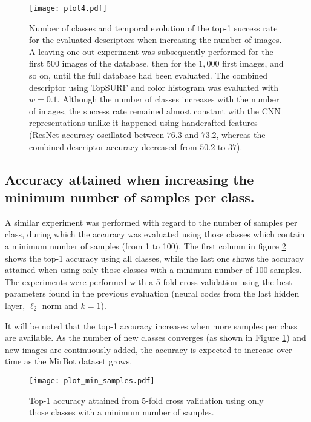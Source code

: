 \documentclass[final, twocolumn]{elsarticle}
\begin{document}
\begin{figure}
\center
\texttt{[image: plot4.pdf]}
\caption{\label{Plot4}Number of classes and temporal evolution of the top-1 success rate for the evaluated descriptors when increasing the number of images. A leaving-one-out experiment was subsequently performed for the first $500$ images of the database, then for the $1,000$ first images, and so on, until the full database had been evaluated. The combined descriptor using TopSURF and color histogram was evaluated with $w=0.1$. Although the number of classes increases with the number of images, the success rate remained almost constant with the CNN representations unlike it happened using handcrafted features (ResNet accuracy oscillated between $76.3$ and $73.2$, whereas the combined descriptor accuracy decreased from $50.2$ to $37$).}
\end{figure}


\subsection{Accuracy attained when increasing the minimum number of samples per class.}

A similar experiment was performed with regard to the number of samples per class, during which the accuracy was evaluated using those classes which contain a minimum number of samples (from 1 to 100). The first column in figure \ref{fig:plot_min_samples} shows the top-1 accuracy using all classes, while the last one shows the accuracy attained when using only those classes with a minimum number of 100 samples. The experiments were performed with a 5-fold cross validation using the best parameters found in the previous evaluation (neural codes from the last hidden layer, $\ell_2$ norm and $k=1$). 

It will be noted that the top-1 accuracy increases when more samples per class are available. As the number of new classes converges (as shown in Figure \ref{Plot4}) and new images are continuously added, the accuracy is expected to increase over time as the MirBot dataset grows. 

\begin{figure}
\center
\texttt{[image: plot\_min\_samples.pdf]}
\caption{\label{fig:plot_min_samples}Top-1 accuracy attained from 5-fold cross validation using only those classes with a minimum number of samples.}
\end{figure}
\end{document}
